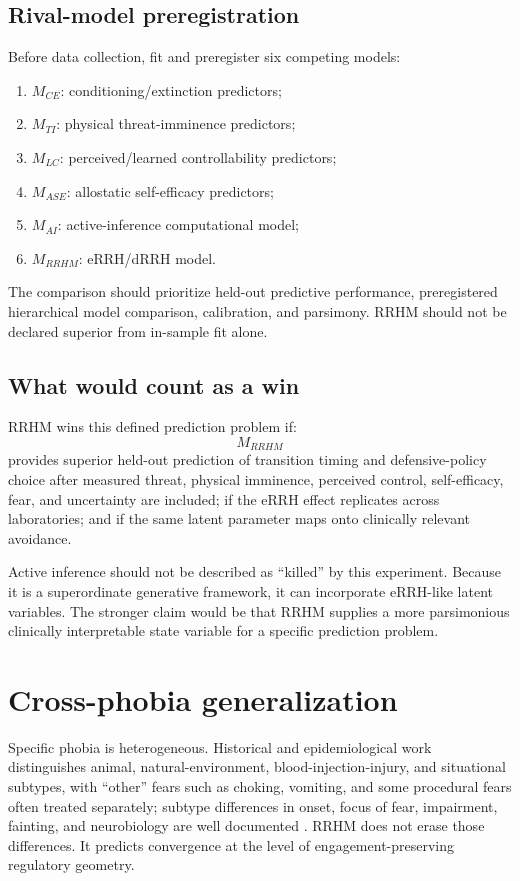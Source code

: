 \documentclass[10pt]{article}
\begin{document}
\subsection{Rival-model preregistration}
Before data collection, fit and preregister six competing models:
\begin{enumerate}[leftmargin=2em]
\item $M_{CE}$: conditioning/extinction predictors;
\item $M_{TI}$: physical threat-imminence predictors;
\item $M_{LC}$: perceived/learned controllability predictors;
\item $M_{ASE}$: allostatic self-efficacy predictors;
\item $M_{AI}$: active-inference computational model;
\item $M_{RRHM}$: eRRH/dRRH model.
\end{enumerate}
The comparison should prioritize held-out predictive performance, preregistered hierarchical model comparison, calibration, and parsimony. RRHM should not be declared superior from in-sample fit alone.

\subsection{What would count as a win}
RRHM wins this defined prediction problem if:
\[
M_{RRHM}
\]
provides superior held-out prediction of transition timing and defensive-policy choice after measured threat, physical imminence, perceived control, self-efficacy, fear, and uncertainty are included; if the eRRH effect replicates across laboratories; and if the same latent parameter maps onto clinically relevant avoidance.

Active inference should not be described as ``killed'' by this experiment. Because it is a superordinate generative framework, it can incorporate eRRH-like latent variables. The stronger claim would be that RRHM supplies a more parsimonious clinically interpretable state variable for a specific prediction problem.

\section{Cross-phobia generalization}
Specific phobia is heterogeneous. Historical and epidemiological work distinguishes animal, natural-environment, blood-injection-injury, and situational subtypes, with ``other'' fears such as choking, vomiting, and some procedural fears often treated separately; subtype differences in onset, focus of fear, impairment, fainting, and neurobiology are well documented \cite{lipsitz2002,depla2008,enigma2024}. RRHM does not erase those differences. It predicts convergence at the level of engagement-preserving regulatory geometry.
\end{document}
